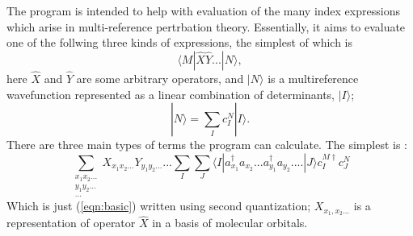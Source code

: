 The program is intended to help with evaluation of the many index expressions
which arise in multi-reference pertrbation theory.  Essentially, it aims to
evaluate one of the follwing three kinds of expressions, the simplest of which
is
\begin{equation}
\langle M | \hat{X} \hat{Y} ... | N \rangle,
\label{eqn:basic}
\end{equation}
\noindent here $\hat{X}$ and $\hat{Y}$ are some arbitrary operators, and $| N
\rangle$  is a multireference wavefunction represented as a linear combination
of determinants, $|I\rangle $;
\begin{equation}
|N\rangle = \sum_{I} c_{I}^{N}| I \rangle.
\end{equation} 
\noindent There are three main types of terms the program can calculate. The simplest is :
\begin{equation}
\sum_{\substack{ x_{1}x_{2}...\\ y_{1}y_{2}... \\ ...}} X_{x_{1}x_{2}...} Y_{y_{1}y_{2}...} ...
\sum_{I}\sum_{J}
\langle I | a^{\dagger}_{x_{1}} a_{x_{2}}...a^{\dagger}_{y_{1}}a_{y_{2}}....| J \rangle 
 c^{M \dagger}_{I}c^{N}_{J}
\label{eqn:basic_2nd_quantized}
\end{equation}
\noindent  Which is just (\ref{eqn:basic}) written using second quantization;
$X_{x_{1},x_{2}...}$ is a representation of operator $\hat{X}$ in a basis of
molecular orbitals. \\

